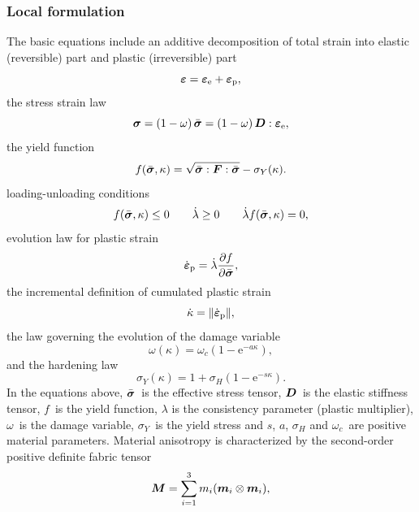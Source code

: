 \documentclass[a4paper]{article}
\newcommand{\mbf}[1]{\mbox{\boldmath$#1$}}
\newcommand{\eps} {\mbf{\varepsilon}}
\newcommand{\epspd} {\dot{\eps}_{\mathrm{p}}}
\newcommand{\veps}{\mbf{\varepsilon}}  %
\newcommand{\vsig}{\mbf{\sigma}}%
\begin{document}
\subsubsection{Local formulation}
The basic equations include an additive decomposition of total strain into elastic (reversible) part and plastic (irreversible) part
\begin{equation}\label{additiveDecomposition}
\veps = \veps_{\rm{e}}+\veps_{\rm{p}},
\end{equation}
the stress strain law
\begin{equation}\label{constitutiveLaw}
\vsig = \left(1-\omega\right)\bar{\vsig}=\left(1-\omega\right)\mbf{D}:{\veps}_{\rm{e}},
\end{equation}
the yield function 
\begin{equation}
f(\bar{\vsig},\kappa) = \sqrt{\bar{\vsig} :\mbf{F}:\bar{\vsig}} - \sigma_Y(\kappa).
\end{equation}
loading-unloading conditions
\begin{equation}
f(\bar{\vsig},\kappa)\le 0 \qquad \dot{\lambda}\geq 0 \qquad \dot{\lambda}f(\bar{\vsig},\kappa)=0,
\end{equation}
evolution law for plastic strain
\begin{equation}
\dot{\veps}_{\rm{p}} = \dot{\lambda} \frac{\partial f}{\partial \bar{\vsig}},
\end{equation}
the incremental definition of cumulated plastic strain
\begin{equation}
\dot{\kappa} = \| \epspd \|,
\end{equation}
the law governing the evolution of the damage variable
\begin{equation}
\omega(\kappa) = \omega_c(1-\mbox{e}^{-a\kappa}),
\end{equation}
and the hardening law
\begin{equation}
\sigma_Y(\kappa) = 1+\sigma_H(1-\mbox{e}^{-s\kappa}).
\end{equation}
In the equations above, $\bar{\vsig}$~is the effective stress tensor, $\mbf{D}$~is the elastic stiffness tensor, $f$~is the yield function, $\lambda$ is the consistency parameter (plastic multiplier), $\omega$~is the damage variable, $\sigma_Y$~is the yield stress and $s$, $a$, $\sigma_H$ and  $\omega_c$~are positive material parameters. 
Material anisotropy is characterized by the second-order positive definite  fabric tensor 
\begin{equation}\label{fabric}
\mbf{M} = \sum_{i=1}^3 m_i(\mbf{m}_i \otimes \mbf{m}_i),
\end{equation}
\end{document}
